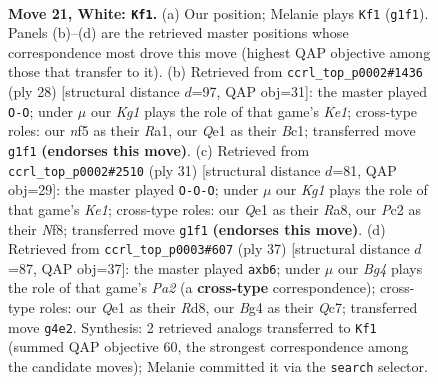 \documentclass[11pt]{article}
\begin{document}
\clearpage

\begin{figure}[p]\centering
\begin{subfigure}{0.46\textwidth}\centering
\resizebox{\linewidth}{!}{%
\newchessgame
\chessboard[
  setfen={r1b3k1/pppp1pp1/1b3q1p/3P1n2/6B1/2N4P/PPP2PP1/R1B1Q1K1 w - - 4 21},
  showmover=false,
  pgfstyle=straightmove, color=movearrow, markmove={g1-f1}
]}
\caption{}
\end{subfigure}\hfill
\begin{subfigure}{0.46\textwidth}\centering
\resizebox{\linewidth}{!}{%
\newchessgame
\chessboard[
  setfen={r1b2rk1/pp2q1pp/2P1pb2/2n2p2/2P5/P4N2/1PQ1BPPP/R1B1K2R w KQ - 3 15},
  showmover=false,
  pgfstyle=straightmove, color=movearrow, markmove={e1-g1}
]}
\caption{}
\end{subfigure}
\\[4pt]
\begin{subfigure}{0.46\textwidth}\centering
\resizebox{\linewidth}{!}{%
\newchessgame
\chessboard[
  setfen={r3kn1r/ppq2pp1/2p1b2p/8/2NPQ1P1/4P3/PP2BP1b/R1B1K2R b Qkq - 0 16},
  showmover=false,
  pgfstyle=straightmove, color=movearrow, markmove={e8-c8}
]}
\caption{}
\end{subfigure}\hfill
\begin{subfigure}{0.46\textwidth}\centering
\resizebox{\linewidth}{!}{%
\newchessgame
\chessboard[
  setfen={3r2k1/ppq1bppb/1Np2n1p/4p3/PP2P2N/6PP/2P1QPB1/R3B1K1 b - - 0 19},
  showmover=false,
  pgfstyle=straightmove, color=movearrow, markmove={a7-b6}
]}
\caption{}
\end{subfigure}
\caption{\textbf{Move 21, White: \texttt{Kf1}.} (a) Our position; Melanie plays \texttt{Kf1} (\texttt{g1f1}). Panels (b)--(d) are the retrieved master positions whose correspondence most drove this move (highest QAP objective among those that transfer to it). (b) Retrieved from \texttt{ccrl\_top\_p0002\#1436} (ply 28) [structural distance $d$=97, QAP obj=31]: the master played \texttt{O-O}; under $\mu$ our \emph{Kg1} plays the role of that game's \emph{Ke1}; cross-type roles: our \emph{n}f5 as their \emph{R}a1, our \emph{Q}e1 as their \emph{B}c1; transferred move \texttt{g1f1} \textbf{(endorses this move)}. (c) Retrieved from \texttt{ccrl\_top\_p0002\#2510} (ply 31) [structural distance $d$=81, QAP obj=29]: the master played \texttt{O-O-O}; under $\mu$ our \emph{Kg1} plays the role of that game's \emph{Ke1}; cross-type roles: our \emph{Q}e1 as their \emph{R}a8, our \emph{P}c2 as their \emph{N}f8; transferred move \texttt{g1f1} \textbf{(endorses this move)}. (d) Retrieved from \texttt{ccrl\_top\_p0003\#607} (ply 37) [structural distance $d$=87, QAP obj=37]: the master played \texttt{axb6}; under $\mu$ our \emph{Bg4} plays the role of that game's \emph{Pa2} (a \textbf{cross-type} correspondence); cross-type roles: our \emph{Q}e1 as their \emph{R}d8, our \emph{B}g4 as their \emph{Q}c7; transferred move \texttt{g4e2}. Synthesis: 2 retrieved analogs transferred to \texttt{Kf1} (summed QAP objective 60, the strongest correspondence among the candidate moves); Melanie committed it via the \texttt{search} selector.}
\label{fig:thought-m40}
\end{figure}
\end{document}
